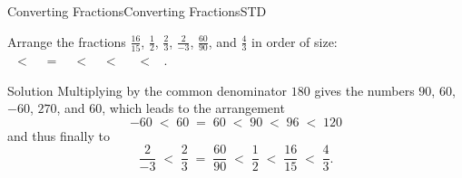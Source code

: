 \begin{MXContent}{Converting Fractions}{Converting Fractions}{STD}
\begin{MExercise}
Arrange the fractions 
$\frac{16}{15}$, $\frac12$, $\frac23$, $\frac2{-3}$, $\frac{60}{90}$, and $\frac43$ in order of size:
\ \\
\ $<$\ 
\ $=$\ 
\ $<$\ 
\ $<$\ 
 \ $<$\ 
 .
\ \\
\begin{MHint}{Solution}
Multiplying by the common denominator $180$ gives the numbers $90$, $60$, $-60$, $270$, and $60$,
which leads to the arrangement
$$
-60\; < \; 60 \; = \; 60 \; < \; 90\; < \; 96 \; < \; 120
$$
and thus finally to 
$$
\frac2{-3} \; < \; \frac23 \;=\; \frac{60}{90} \; <\; \frac12\; < \; \frac{16}{15} \; < \; \frac{4}{3}.
$$
\end{MHint}
\end{MExercise}

\end{MXContent}

